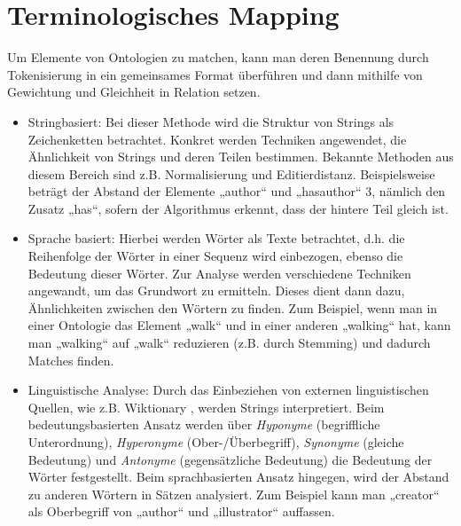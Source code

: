 	\section{Terminologisches Mapping}
	Um Elemente von Ontologien zu matchen, kann man deren Benennung durch Tokenisierung in ein gemeinsames Format überführen und dann mithilfe von Gewichtung und Gleichheit in Relation setzen.
	\begin{itemize}
		\item Stringbasiert: Bei dieser Methode wird die Struktur von Strings als
		Zeichenketten betrachtet. Konkret werden Techniken angewendet, die Ähnlichkeit von Strings und deren Teilen bestimmen. Bekannte Methoden aus diesem Bereich sind z.B. Normalisierung und Editierdistanz. \cite{EuzShv07}  Beispielsweise beträgt der Abstand der Elemente „author“ und „hasauthor“ 3, nämlich den Zusatz „has“, sofern der Algorithmus erkennt, dass der hintere Teil gleich ist.
		\item  Sprache basiert: Hierbei werden Wörter als Texte betrachtet, d.h. die
		Reihenfolge der Wörter in einer Sequenz wird einbezogen, ebenso die Bedeutung dieser Wörter. Zur Analyse werden verschiedene Techniken angewandt, um das Grundwort zu ermitteln. Dieses dient dann dazu, Ähnlichkeiten zwischen den Wörtern zu finden. \cite{EuzShv07}  Zum Beispiel, wenn man in einer Ontologie das Element „walk“ und in einer anderen „walking“ hat, kann man „walking“ auf „walk“ reduzieren (z.B. durch Stemming) und dadurch Matches finden.
		\item Linguistische Analyse: Durch das Einbeziehen von externen
		linguistischen Quellen, wie z.B. Wiktionary , werden Strings interpretiert.
		Beim bedeutungsbasierten Ansatz werden über \textit{Hyponyme} (begriffliche
		Unterordnung), \textit{Hyperonyme} (Ober-/Überbegriff), \textit{Synonyme}
		(gleiche Bedeutung) und \textit{Antonyme} (gegensätzliche Bedeutung) die
		Bedeutung der Wörter festgestellt. Beim sprachbasierten Ansatz hingegen, wird der Abstand zu anderen Wörtern in Sätzen analysiert. \cite{EuzShv07} Zum Beispiel kann man „creator“ als Oberbegriff von „author“ und „illustrator“ auffassen.
	\end{itemize}
	
